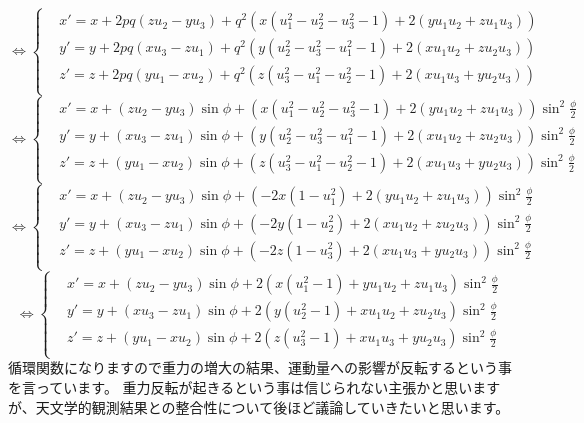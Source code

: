\documentclass[a4paper,12pt,notitlepage]{jsreport}
\begin{document}
\begin{equation}
  \Longleftrightarrow
  \left\{
    \begin{aligned}
      &x' = x + 2 p q (z u_2 - y u_3) + q^2 (x (u_1^2 - u_2^2 - u_3^2 - 1) + 2 (y u_1 u_2 + z u_1 u_3)) \\
      &y' = y + 2 p q (x u_3 - z u_1) + q^2 (y (u_2^2 - u_3^2 - u_1^2 - 1) + 2 (x u_1 u_2 + z u_2 u_3)) \\
      &z' = z + 2 p q (y u_1 - x u_2) + q^2 (z (u_3^2 - u_1^2 - u_2^2 - 1) + 2 (x u_1 u_3 + y u_2 u_3)) \\
    \end{aligned}
  \right.
\end{equation}
\begin{equation}
  \Longleftrightarrow
  \left\{
    \begin{aligned}
      &x' = x + (z u_2 - y u_3) \sin \phi + (x (u_1^2 - u_2^2 - u_3^2 - 1) + 2 (y u_1 u_2 + z u_1 u_3)) \sin^2 \frac{\phi}{2} \\
      &y' = y + (x u_3 - z u_1) \sin \phi + (y (u_2^2 - u_3^2 - u_1^2 - 1) + 2 (x u_1 u_2 + z u_2 u_3)) \sin^2 \frac{\phi}{2} \\
      &z' = z + (y u_1 - x u_2) \sin \phi + (z (u_3^2 - u_1^2 - u_2^2 - 1) + 2 (x u_1 u_3 + y u_2 u_3)) \sin^2 \frac{\phi}{2} \\
    \end{aligned}
  \right.
\end{equation}
\begin{equation}
  \Longleftrightarrow
  \left\{
    \begin{aligned}
      &x' = x + (z u_2 - y u_3) \sin \phi + ( - 2 x (1 - u_1^2) + 2 (y u_1 u_2 + z u_1 u_3)) \sin^2 \frac{\phi}{2} \\
      &y' = y + (x u_3 - z u_1) \sin \phi + ( - 2 y (1 - u_2^2) + 2 (x u_1 u_2 + z u_2 u_3)) \sin^2 \frac{\phi}{2} \\
      &z' = z + (y u_1 - x u_2) \sin \phi + ( - 2 z (1 - u_3^2) + 2 (x u_1 u_3 + y u_2 u_3)) \sin^2 \frac{\phi}{2} \\
    \end{aligned}
  \right.
\end{equation}
\begin{equation}
  \Longleftrightarrow
  \left\{
    \begin{aligned}
      &x' = x + (z u_2 - y u_3) \sin \phi + 2 (x (u_1^2 - 1) + y u_1 u_2 + z u_1 u_3) \sin^2 \frac{\phi}{2} \\
      &y' = y + (x u_3 - z u_1) \sin \phi + 2 (y (u_2^2 - 1) + x u_1 u_2 + z u_2 u_3) \sin^2 \frac{\phi}{2} \\
      &z' = z + (y u_1 - x u_2) \sin \phi + 2 (z (u_3^2 - 1) + x u_1 u_3 + y u_2 u_3) \sin^2 \frac{\phi}{2} \\
    \end{aligned}
  \right.
\end{equation}
循環関数になりますので重力の増大の結果、運動量への影響が反転するという事を言っています。
重力反転が起きるという事は信じられない主張かと思いますが、天文学的観測結果との整合性について後ほど議論していきたいと思います。
\end{document}
